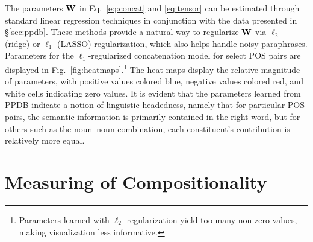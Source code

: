 \documentclass[11pt]{article}
\newcommand{\bW}{{\bf W}}
\begin{document}
The parameters $\bW$ in Eq.~\ref{eq:concat} and \ref{eq:tensor} can be estimated through standard linear regression techniques in conjunction with the data presented in \S\ref{sec:ppdb}.
These methods provide a natural way to regularize $\bW$ via $\ell_2$ (ridge) or $\ell_1$ (LASSO) regularization, which also helps handle noisy paraphrases.  
Parameters for the $\ell_1$-regularized concatenation model for select POS pairs are displayed in Fig.~\ref{fig:heatmaps}.\footnote{Parameters learned with $\ell_2$ regularization yield too many non-zero values, making visualization less informative.}
The heat-maps display the relative magnitude of parameters, with positive values colored blue, negative values colored red, and white cells indicating zero values. 
It is evident that the parameters learned from PPDB indicate a notion of linguistic headedness, namely that for particular POS pairs, the semantic information is primarily contained in the right word, but for others such as the noun--noun combination, each constituent's contribution is relatively more equal. 


\section{Measuring of Compositionality}
\label{sec:scoring}
\end{document}
